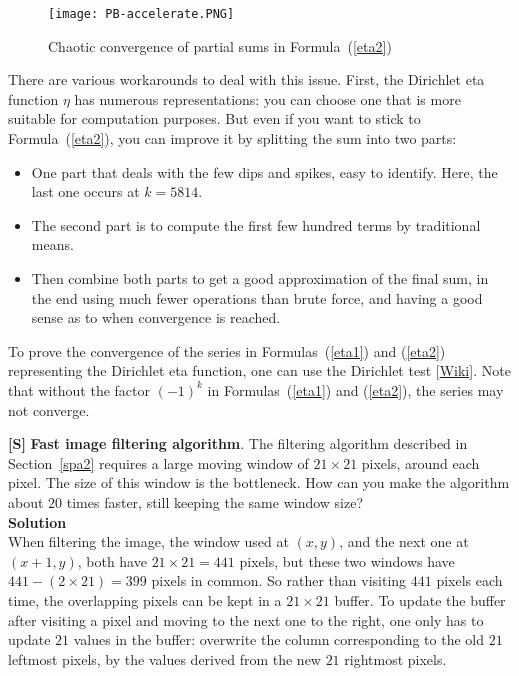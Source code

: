 \documentclass[10pt]{article}
\begin{document}
\begin{Exercise}
\begin{figure}[H]
\centering
\texttt{[image: PB-accelerate.PNG]}
\caption{Chaotic convergence of partial sums in Formula~(\ref{eta2})}
\label{fig:fcc}
\end{figure}

There are various workarounds to deal with this issue. First, the \textcolor{index}{Dirichlet eta function} $\eta$ has numerous representations: you can choose one that is more suitable for 
computation purposes. But even if you want to stick to Formula~(\ref{eta2}), you can improve it by splitting the sum into two parts: 
\begin{itemize}
\item One part that deals with the few dips and spikes, easy to identify. Here, the last one occurs at $k=5814$.
\item The second part is to compute the first few hundred terms by traditional means.
\item Then combine both parts to get a good approximation of the final sum, in the end using much fewer operations than brute force, and having a good sense as to when convergence is reached.
\end{itemize} 
To prove the convergence of the series in Formulas~(\ref{eta1}) and (\ref{eta2}) representing the Dirichlet eta function, one can use the Dirichlet test [\href{https://bit.ly/3prDAL1}{Wiki}]. Note that without the factor $(-1)^k$ in Formulas~(\ref{eta1}) and (\ref{eta2}), the series may not converge.
\end{Exercise}

\begin{Exercise}\label{fastfilter}{\bf [S]} 
{\bf Fast image filtering algorithm}.  The filtering algorithm described in  Section~\ref{spa2} requires a large moving window of $21\times 21$ pixels, around each pixel. The size of this window is the bottleneck. How can you make the algorithm about $20$ times faster, still keeping the same window size? \vspace{1ex} \\
{\bf Solution} \vspace{1ex} \\
When filtering the image, the window used at $(x,y)$, and the next one at $(x+1,y)$, both have $21\times 21 = 441$ pixels, but these two windows have $441 - (2\times 21) = 399$ pixels in common. So rather than visiting $441$ pixels each time, the overlapping pixels can be kept in a $21 \times 21$ buffer. To update the buffer after visiting a pixel and moving to the next one to the right, one only has to update $21$ values in the buffer: overwrite the column corresponding to the old $21$ leftmost pixels, by the values derived from the new $21$ rightmost pixels.  
\end{Exercise}
\end{document}
